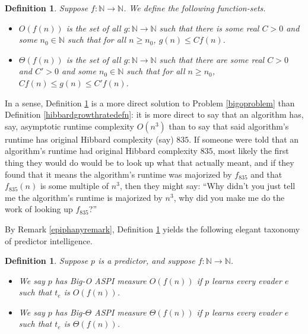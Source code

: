 \documentclass{article}
\newtheorem{definition}[theorem]{Definition}
\begin{document}
\begin{definition}
\label{bigodefn}
    Suppose $f:\mathbb N\to\mathbb N$. We define the following function-sets.
    \begin{itemize}
        \item
        $O(f(n))$ is the set of all $g:\mathbb N\to\mathbb N$ such that
        there is some real $C>0$ and some $n_0\in\mathbb N$ such that
        for all $n\geq n_0$, $g(n)\leq Cf(n)$.
        \item
        $\Theta(f(n))$ is the set of all $g:\mathbb N\to\mathbb N$ such that
        there are some real $C>0$ and $C'>0$ and some $n_0\in\mathbb N$ such that
        for all $n\geq n_0$, $Cf(n)\leq g(n)\leq C'f(n)$.
    \end{itemize}
\end{definition}

In a sense, Definition \ref{bigodefn} is a more direct solution to
Problem \ref{bigoproblem} than Definition \ref{hibbardgrowthratedefn}:
it is more direct to say that an algorithm has, say, asymptotic runtime
complexity $O(n^3)$ than to say that said algorithm's runtime has original
Hibbard complexity (say) $835$. If someone were told that an algorithm's runtime
had original Hibbard complexity $835$, most likely the first thing they would do
would be to look up what that actually meant, and if they found that it means the
algorithm's runtime was majorized by $f_{835}$ and that $f_{835}(n)$ is some
multiple of $n^3$, then
they might say: ``Why didn't you just tell me the algorithm's runtime is
majorized by $n^3$, why did you make me do the work of looking up $f_{835}$?''

By Remark \ref{epiphanyremark}, Definition \ref{bigodefn} yields the following elegant
taxonomy of predictor intelligence.

\begin{definition}
\label{bigointelligencedefn}
    Suppose $p$ is a predictor, and suppose $f:\mathbb N\to\mathbb N$.
    \begin{itemize}
        \item
        We say \emph{$p$ has Big-O ASPI measure $O(f(n))$} if
        $p$ learns every evader $e$ such that $t_e$ is $O(f(n))$.
        \item
        We say \emph{$p$ has Big-$\Theta$ ASPI measure $\Theta(f(n))$} if
        $p$ learns every evader $e$ such that $t_e$ is $\Theta(f(n))$.
    \end{itemize}
\end{definition}
\end{document}
